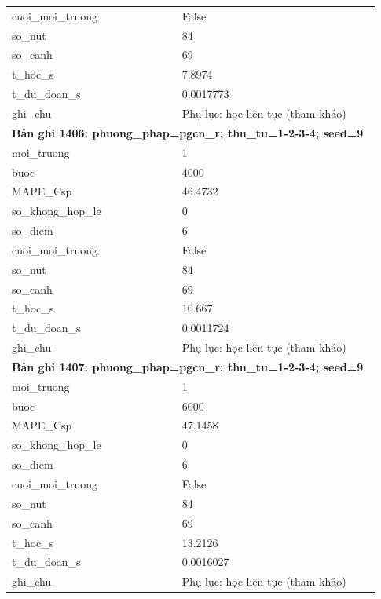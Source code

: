 \begin{longtable}{p{0.43\linewidth}p{0.50\linewidth}}
cuoi\_\allowbreak moi\_\allowbreak truong & False \\
so\_\allowbreak nut & 84 \\
so\_\allowbreak canh & 69 \\
t\_\allowbreak hoc\_\allowbreak s & 7.8974 \\
t\_\allowbreak du\_\allowbreak doan\_\allowbreak s & 0.0017773 \\
ghi\_\allowbreak chu & Phụ lục: học liên tục (tham khảo) \\
\midrule
\multicolumn{2}{p{0.95\linewidth}}{\textbf{Bản ghi 1406: phuong\_phap=pgcn\_r; thu\_tu=1-2-3-4; seed=9}} \\
moi\_\allowbreak truong & 1 \\
buoc & 4000 \\
MAPE\_\allowbreak Csp & 46.4732 \\
so\_\allowbreak khong\_\allowbreak hop\_\allowbreak le & 0 \\
so\_\allowbreak diem & 6 \\
cuoi\_\allowbreak moi\_\allowbreak truong & False \\
so\_\allowbreak nut & 84 \\
so\_\allowbreak canh & 69 \\
t\_\allowbreak hoc\_\allowbreak s & 10.667 \\
t\_\allowbreak du\_\allowbreak doan\_\allowbreak s & 0.0011724 \\
ghi\_\allowbreak chu & Phụ lục: học liên tục (tham khảo) \\
\midrule
\multicolumn{2}{p{0.95\linewidth}}{\textbf{Bản ghi 1407: phuong\_phap=pgcn\_r; thu\_tu=1-2-3-4; seed=9}} \\
moi\_\allowbreak truong & 1 \\
buoc & 6000 \\
MAPE\_\allowbreak Csp & 47.1458 \\
so\_\allowbreak khong\_\allowbreak hop\_\allowbreak le & 0 \\
so\_\allowbreak diem & 6 \\
cuoi\_\allowbreak moi\_\allowbreak truong & False \\
so\_\allowbreak nut & 84 \\
so\_\allowbreak canh & 69 \\
t\_\allowbreak hoc\_\allowbreak s & 13.2126 \\
t\_\allowbreak du\_\allowbreak doan\_\allowbreak s & 0.0016027 \\
ghi\_\allowbreak chu & Phụ lục: học liên tục (tham khảo) \\

\end{longtable}

